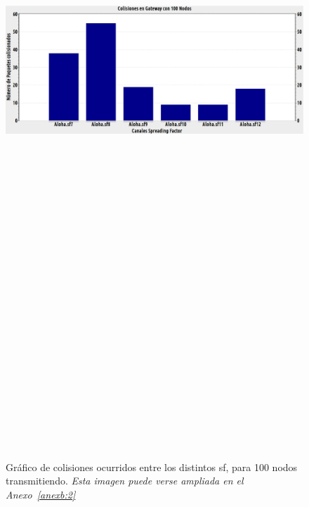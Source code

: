 \begin{justify}
\begin{figure}[!ht]
\centering
\includegraphics[width=13cm,height=30cm,keepaspectratio]{images/colisiones100nodos.eps}
\caption{Gráfico de colisiones ocurridos entre los distintos \gls{sf}, para 100 nodos transmitiendo. \textit{Esta imagen puede verse ampliada en el Anexo~\ref{anexb:2}}}
\label{nodos:100}
\end{figure}

\end{justify}
